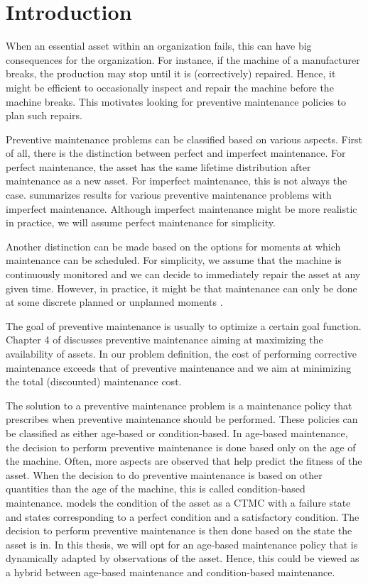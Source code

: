 \documentclass[a4paper]{thesis}
\theoremstyle{definition}
\begin{document}
\tableofcontents

\mainmatter

\chapter{Introduction}\label{chapter:Introduction}
When an essential asset within an organization fails, this can have big consequences for the organization.
For instance, if the machine of a manufacturer breaks, the production may stop until it is (correctively) repaired.
Hence, it might be efficient to occasionally inspect and repair the machine before the machine breaks.
This motivates looking for preventive maintenance policies to plan such repairs.

Preventive maintenance problems can be classified based on various aspects.
First of all, there is the distinction between perfect and imperfect maintenance.
For perfect maintenance, the asset has the same lifetime distribution after maintenance as a new asset.
For imperfect maintenance, this is not always the case.
\cite{Pham1996} summarizes results for various preventive maintenance problems with imperfect maintenance.
Although imperfect maintenance might be more realistic in practice, we will assume perfect maintenance for simplicity.

Another distinction can be made based on the options for moments at which maintenance can be scheduled.
For simplicity, we assume that the machine is continuously monitored and we can decide to immediately repair the asset at any given time.
However, in practice, it might be that maintenance can only be done at some discrete planned or unplanned moments \cite{Kalosi2016}.

The goal of preventive maintenance is usually to optimize a certain goal function.
Chapter 4 of \cite{Zacks2012} discusses preventive maintenance aiming at maximizing the availability of assets.
In our problem definition, the cost of performing corrective maintenance exceeds that of preventive maintenance and we aim at minimizing the total (discounted) maintenance cost.

The solution to a preventive maintenance problem is a maintenance policy that prescribes when preventive maintenance should be performed.
These policies can be classified as either age-based or condition-based.
In age-based maintenance, the decision to perform preventive maintenance is done based only on the age of the machine.
Often, more aspects are observed that help predict the fitness of the asset.
When the decision to do preventive maintenance is based on other quantities than the age of the machine, this is called condition-based maintenance.
\cite{Kalosi2016} models the condition of the asset as a CTMC with a failure state and states corresponding to a perfect condition and a satisfactory condition.
The decision to perform preventive maintenance is then done based on the state the asset is in.
In this thesis, we will opt for an age-based maintenance policy that is dynamically adapted by observations of the asset.
Hence, this could be viewed as a hybrid between age-based maintenance and condition-based maintenance.
\end{document}
